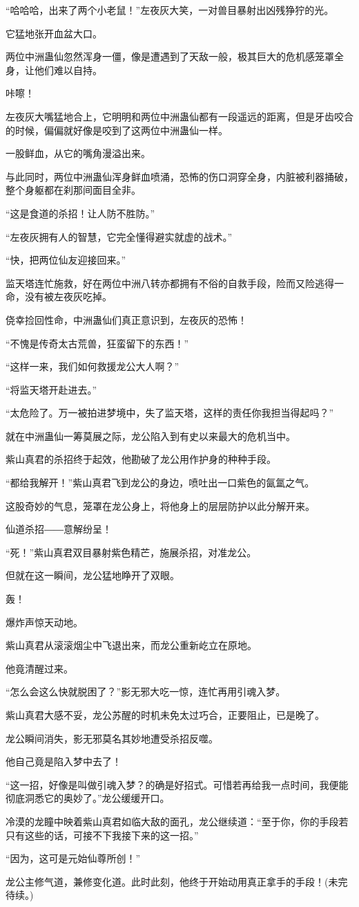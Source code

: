 \begin{this_body}
“哈哈哈，出来了两个小老鼠！”左夜灰大笑，一对兽目暴射出凶残狰狞的光。

它猛地张开血盆大口。

两位中洲蛊仙忽然浑身一僵，像是遭遇到了天敌一般，极其巨大的危机感笼罩全身，让他们难以自持。

咔嚓！

左夜灰大嘴猛地合上，它明明和两位中洲蛊仙都有一段遥远的距离，但是牙齿咬合的时候，偏偏就好像是咬到了这两位中洲蛊仙一样。

一股鲜血，从它的嘴角漫溢出来。

与此同时，两位中洲蛊仙浑身鲜血喷涌，恐怖的伤口洞穿全身，内脏被利器捅破，整个身躯都在刹那间面目全非。

“这是食道的杀招！让人防不胜防。”

“左夜灰拥有人的智慧，它完全懂得避实就虚的战术。”

“快，把两位仙友迎接回来。”

监天塔连忙施救，好在两位中洲八转亦都拥有不俗的自救手段，险而又险逃得一命，没有被左夜灰吃掉。

侥幸捡回性命，中洲蛊仙们真正意识到，左夜灰的恐怖！

“不愧是传奇太古荒兽，狂蛮留下的东西！”

“这样一来，我们如何救援龙公大人啊？”

“将监天塔开赴进去。”

“太危险了。万一被拍进梦境中，失了监天塔，这样的责任你我担当得起吗？”

就在中洲蛊仙一筹莫展之际，龙公陷入到有史以来最大的危机当中。

紫山真君的杀招终于起效，他勘破了龙公用作护身的种种手段。

“都给我解开！”紫山真君飞到龙公的身边，喷吐出一口紫色的氤氲之气。

这股奇妙的气息，笼罩在龙公身上，将他身上的层层防护以此分解开来。

仙道杀招――意解纷呈！

“死！”紫山真君双目暴射紫色精芒，施展杀招，对准龙公。

但就在这一瞬间，龙公猛地睁开了双眼。

轰！

爆炸声惊天动地。

紫山真君从滚滚烟尘中飞退出来，而龙公重新屹立在原地。

他竟清醒过来。

“怎么会这么快就脱困了？”影无邪大吃一惊，连忙再用引魂入梦。

紫山真君大感不妥，龙公苏醒的时机未免太过巧合，正要阻止，已是晚了。

龙公瞬间消失，影无邪莫名其妙地遭受杀招反噬。

他自己竟是陷入梦中去了！

“这一招，好像是叫做引魂入梦？的确是好招式。可惜若再给我一点时间，我便能彻底洞悉它的奥妙了。”龙公缓缓开口。

冷漠的龙瞳中映着紫山真君如临大敌的面孔，龙公继续道：“至于你，你的手段若只有这些的话，可接不下我接下来的这一招。”

“因为，这可是元始仙尊所创！”

龙公主修气道，兼修变化道。此时此刻，他终于开始动用真正拿手的手段！(未完待续。)

\end{this_body}

